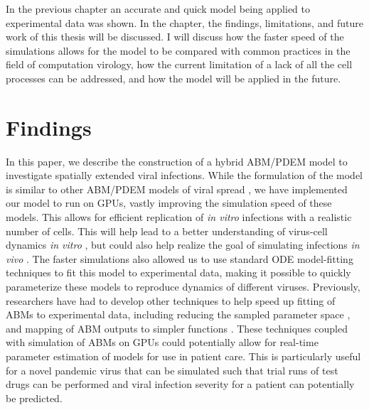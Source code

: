 In the previous chapter an accurate and quick model being applied to experimental data was shown. In the chapter, the findings, limitations, and future work of this thesis will be discussed. I will discuss how the faster speed of the simulations allows for the model to be compared with common practices in the field of computation virology, how the current limitation of a lack of all the cell processes can be addressed, and how the model will be applied in the future.

\section{Findings}

In this paper, we describe the construction of a hybrid ABM/PDEM model to investigate spatially extended viral infections. While the formulation of the model is similar to other ABM/PDEM models of viral spread \cite{beauchemin_simple_2005, bauer_agent-based_2009}, we have implemented our model to run on GPUs, vastly improving the simulation speed of these models. This allows for efficient replication of \emph{in vitro} infections with a realistic number of cells. This will help lead to a better understanding of virus-cell dynamics \emph{in vitro} \cite{blahut21}, but could also help realize the goal of simulating infections \emph{in vivo} \cite{laubenbacher21}. The faster simulations also allowed us to use standard ODE model-fitting techniques to fit this model to experimental data, making it possible to quickly parameterize these models to reproduce dynamics of different viruses. Previously, researchers have had to develop other techniques to help speed up fitting of ABMs to experimental data, including reducing the sampled parameter space \cite{li17}, and mapping of ABM outputs to simpler functions \cite{tong_development_2015, read16}. These techniques coupled with simulation of ABMs on GPUs could potentially allow for real-time parameter estimation of models for use in patient care. This is particularly useful for a novel pandemic virus that can be simulated such that trial runs of test drugs can be performed and viral infection severity for a patient can potentially be predicted. 


